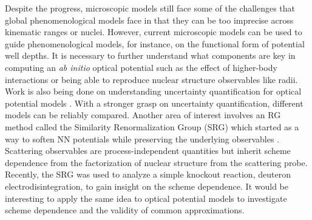 \documentclass[preprintnumbers,floatfix,aps,prc,preprint,nofootinbib]{revtex4-1}
\begin{document}
Despite the progress, microscopic models still face some of the challenges that global phenomenological models face in that they can be too imprecise across kinematic ranges or nuclei. However, current microscopic models can be used to guide phenomenological models, for instance, on the functional form of potential well depths. It is necessary to further understand what components are key in computing an \textit{ab initio} optical potential such as the effect of higher-body interactions or being able to reproduce nuclear structure observables like radii. Work is also being done on understanding uncertainty quantification for optical potential models \cite{King:2018vzw}. With a stronger grasp on uncertainty quantification, different models can be reliably compared. Another area of interest involves an RG method called the Similarity Renormalization Group (SRG) which started as a way to soften NN potentials while preserving the underlying observables \cite{Bogner:2006pc, Bogner:2009bt}. Scattering observables are process-independent quantities but inherit scheme dependence from the factorization of nuclear structure from the scattering probe. Recently, the SRG was used to analyze a simple knockout reaction, deuteron electrodisintegration, to gain insight on the scheme dependence. It would be interesting to apply the same idea to optical potential models to investigate scheme dependence and the validity of common approximations.





\end{document}
